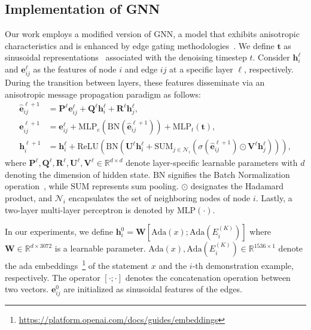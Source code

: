 \documentclass{article}
\begin{document}
\subsection{Implementation of GNN}

Our work employs a modified version of GNN, a model that exhibits anisotropic characteristics and is enhanced by edge gating methodologies~\cite{bresson2018experimental,sun2023difusco}. We define $\mathbf{t}$ as sinusoidal representations~\cite{vaswani2017attention} associated with the denoising timestep $t$. Consider $\boldsymbol{h}_i^{\ell}$ and $\boldsymbol{e}_{ij}^{\ell}$ as the features of node $i$ and edge $ij$ at a specific layer $\ell$, respectively. During the transition between layers, these features disseminate via an anisotropic message propagation paradigm as follows:
\begin{equation}
\begin{aligned}
\hat{\boldsymbol{e}}^{\ell+1}_{ij} &= \boldsymbol{P}^{\ell} \boldsymbol{e}^{\ell}_{ij} + \boldsymbol{Q}^{\ell} \boldsymbol{h}^{\ell}_i + \boldsymbol{R}^{\ell} \boldsymbol{h}^{\ell}_j, \\
\boldsymbol{e}_{ij}^{\ell+1} &= \boldsymbol{e}_{ij}^{\ell} + \mathrm{MLP}_e(\mathrm{BN}(\hat{\boldsymbol{e}}^{\ell+1}_{ij})) + \mathrm{MLP}_t(\mathbf{t}),\\
\boldsymbol{h}_i^{\ell+1} &= \boldsymbol{h}_i^{\ell} + \mathrm{ReLU}(\mathrm{BN}(\boldsymbol{U}^{\ell} \boldsymbol{h}_i^{\ell}+ \mathrm{SUM}_{j \in \mathcal{N}_i}(\sigma(\hat{\boldsymbol{e}}_{ij}^{\ell+1}) \odot\boldsymbol{V}^{\ell}\boldsymbol{h}^{\ell}_j))),
\end{aligned}
\end{equation}
where $\boldsymbol{P}^{\ell},\boldsymbol{Q}^{\ell},\boldsymbol{R}^{\ell}, \boldsymbol{U}^{\ell},\boldsymbol{V}^{\ell} \in \mathbb{R}^{d\times d}$ denote layer-specific learnable parameters with $d$ denoting the dimension of hidden state.  $\mathrm{BN}$ signifies the Batch Normalization operation~\cite{ioffe2015batch}, while $\mathrm{SUM}$ represents sum pooling. $\odot$ designates the Hadamard product, and $\mathcal{N}_i$ encapsulates the set of neighboring nodes of node $i$. Lastly, a two-layer multi-layer perceptron is denoted by $\mathrm{MLP}{(\cdot)}$.

In our experiments, we define $\boldsymbol{h}_{i}^{0}=\boldsymbol{W} [\mathrm{Ada}(x);\mathrm{Ada}(E^{(K)}_i)]$ where $\boldsymbol{W} \in \mathbb{R}^{d \times 3072}$ is a learnable parameter.  $\mathrm{Ada}(x),\mathrm{Ada}(E^{(K)}_i) \in \mathbb{R}^{1536 \times 1}$ denote the ada embeddings~\footnote{\url{https://platform.openai.com/docs/guides/embeddings}} of the statement $x$ and the $i$-th demonstration example, respectively. The operator $[\cdot;\cdot]$ denotes the concatenation operation between two vectors. $\boldsymbol{e}_{ij}^{0}$ are initialized as sinusoidal features of the edges.
\end{document}
